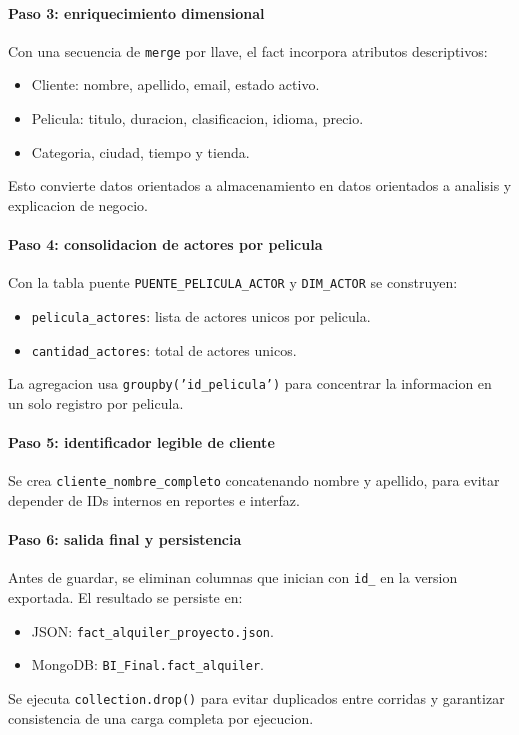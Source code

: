 ﻿\documentclass{article}
\begin{document}
\paragraph{Paso 3: enriquecimiento dimensional}
Con una secuencia de \texttt{merge} por llave, el fact incorpora atributos descriptivos:
\begin{itemize}
    \item Cliente: nombre, apellido, email, estado activo.
    \item Pelicula: titulo, duracion, clasificacion, idioma, precio.
    \item Categoria, ciudad, tiempo y tienda.
\end{itemize}
Esto convierte datos orientados a almacenamiento en datos orientados a analisis y explicacion de negocio.

\paragraph{Paso 4: consolidacion de actores por pelicula}
Con la tabla puente \texttt{PUENTE\_PELICULA\_ACTOR} y \texttt{DIM\_ACTOR} se construyen:
\begin{itemize}
    \item \texttt{pelicula\_actores}: lista de actores unicos por pelicula.
    \item \texttt{cantidad\_actores}: total de actores unicos.
\end{itemize}
La agregacion usa \texttt{groupby('id\_pelicula')} para concentrar la informacion en un solo registro por pelicula.

\paragraph{Paso 5: identificador legible de cliente}
Se crea \texttt{cliente\_nombre\_completo} concatenando nombre y apellido, para evitar depender de IDs internos en reportes e interfaz.

\paragraph{Paso 6: salida final y persistencia}
Antes de guardar, se eliminan columnas que inician con \texttt{id\_} en la version exportada. El resultado se persiste en:
\begin{itemize}
    \item JSON: \texttt{fact\_alquiler\_proyecto.json}.
    \item MongoDB: \texttt{BI\_Final.fact\_alquiler}.
\end{itemize}
Se ejecuta \texttt{collection.drop()} para evitar duplicados entre corridas y garantizar consistencia de una carga completa por ejecucion.
\end{document}
